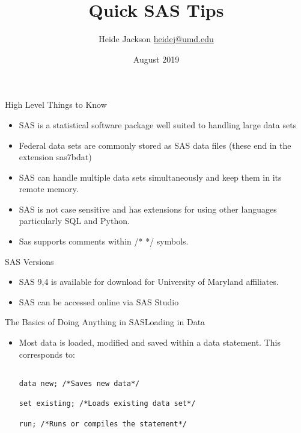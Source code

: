 \documentclass{beamer}
\title{Quick SAS Tips}
\author{\texorpdfstring{Heide Jackson \newline\url{heidej@umd.edu}}{Author}}
\institute{University of Maryland Population Research Center}
\date{August 2019}
\begin{document}
\maketitle

\begin{frame}{High Level Things to Know}

\begin{itemize}

\item SAS is a statistical software package well suited to handling large data sets

\item Federal data sets are commonly stored as SAS data files (these end in the extension sas7bdat)

\item SAS can handle multiple data sets simultaneously and keep them in its remote memory.

\item SAS is not case sensitive and has extensions for using other languages particularly SQL and Python.

\item Sas supports comments within /* */ symbols.

\end{itemize}

\end{frame}





\begin{frame}{SAS Versions}

\begin{itemize}

\item SAS 9,4 is available for download for University of Maryland affiliates.

\item SAS can be accessed online via SAS Studio

\end{itemize}

\end{frame}



\begin{frame}[fragile]{The Basics of Doing Anything in SAS}{Loading in Data}

\begin{itemize}

\item Most data is loaded, modified and saved within a data statement.  This corresponds to: 

\begin{verbatim}

data new; /*Saves new data*/

set existing; /*Loads existing data set*/

run; /*Runs or compiles the statement*/

\end{verbatim}

\end{itemize}

\end{frame}
\end{document}
